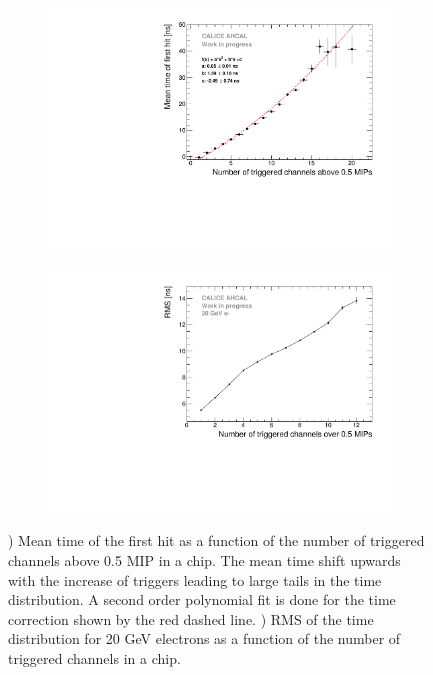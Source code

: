 \documentclass{JINST}
\begin{document}
\begin{figure}[htbp!]
	\begin{subfigure}[t]{0.49\textwidth}
		\centering
		\includegraphics[width=1\linewidth]{fig/NumberHits_Dependance_AllEnergies.pdf}
		\caption{} \label{fig:nhits_profile}
	\end{subfigure}
	\hfill
	\begin{subfigure}[t]{0.49\textwidth}
		\centering
		\includegraphics[width=1\linewidth]{fig/ParametrisationPedestalShift_20GeV.pdf}
		\caption{} \label{fig:nhits_RMS_profile}
	\end{subfigure}
	\caption{) Mean time of the first hit as a function of the number of triggered channels above 0.5 MIP in a chip. The mean time shift upwards with the increase of triggers leading to large tails in the time distribution. A second order polynomial fit is done for the time correction shown by the red dashed line. ) RMS of the time distribution for 20 GeV electrons as a function of the number of triggered channels in a chip.}
\end{figure}
\end{document}
